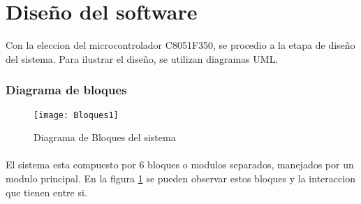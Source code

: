 \section{Diseño del software} %
\label{sec:diseno_del_software}


Con la eleccion del microcontrolador C8051F350, se procedio a la etapa de diseño del sistema. Para ilustrar el diseño, se utilizan diagramas UML.

\subsubsection{Diagrama de bloques} %
\label{ssub:diagrama_de_bloques}

\begin{figure}[h]
  \centering
  \texttt{[image: Bloques1]}
  \caption{Diagrama de Bloques del sistema}\label{fig:bloques1}
\end{figure}

\paragraph{}
El sistema esta compuesto por 6 bloques o modulos separados, manejados por un modulo principal. En la figura \ref{fig:bloques1} se pueden observar estos bloques y la interaccion que tienen entre si. 
\paragraph{}


